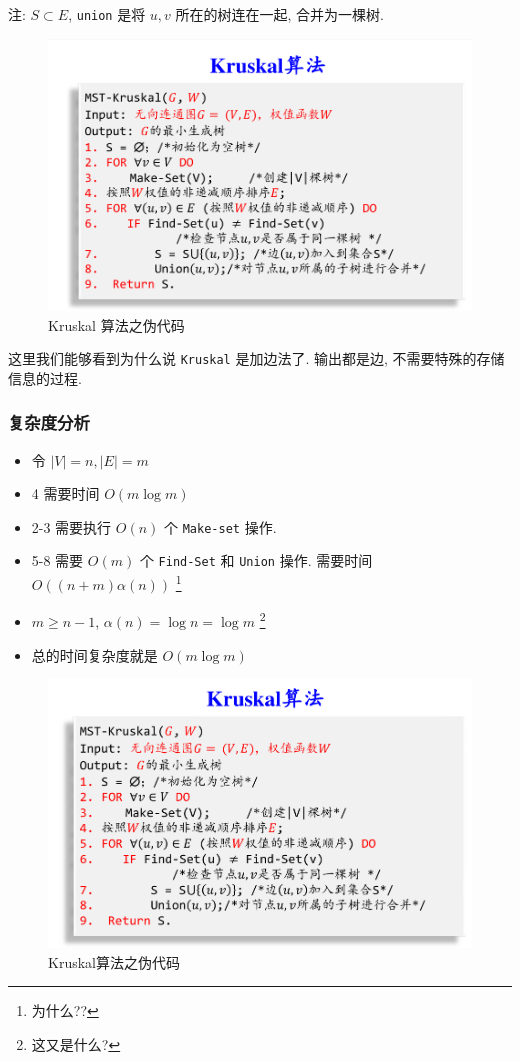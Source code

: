 \documentclass[a4paper, 10pt]{ctexart} %
\begin{document}
注: $S \subset E$, \verb|union| 是将 $u,v$ 所在的树连在一起, 合并为一棵树.

\begin{figure}[H]
    \centering
    \includegraphics[scale = 0.5]{8.png}
    \caption{Kruskal 算法之伪代码}
\end{figure}

这里我们能够看到为什么说 \verb|Kruskal| 是加边法了. 输出都是边, 不需要特殊的存储信息的过程.
\subsubsection{复杂度分析}

\begin{itemize}
    \item 令 $\left| V \right|  =n , \left| E \right|  =m$
    \item 4 需要时间 $O \left( m \log m\right)$
    \item 2-3 需要执行 $O \left(n\right)$ 个 \verb|Make-set| 操作. 
    \item 5-8 需要 $O \left(m\right)$ 个 \verb|Find-Set| 和 \verb|Union| 操作. 需要时间 $O \left( \left(n+m\right) \alpha (n)\right)$ \footnote{为什么??}
    \item $m \ge n-1$, $\alpha \left(n\right) = \log  n = \log m$ \footnote{这又是什么?}
    \item 总的时间复杂度就是 $O\left(m \log  m  \right)$
\end{itemize}
\begin{figure}
    \centering
    \includegraphics[scale = 0.5]{9.png}
    \caption{Kruskal算法之伪代码}
\end{figure}
\end{document}
